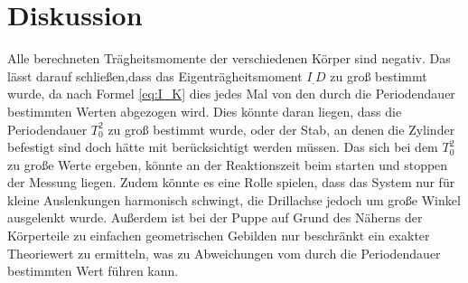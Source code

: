 \section{Diskussion}
\label{sec:Diskussion}
Alle berechneten Trägheitsmomente der verschiedenen Körper sind negativ.
Das lässt darauf schließen,dass das Eigenträgheitsmoment $I_.D$ zu groß bestimmt wurde, da nach Formel \eqref{eq:I_K} dies jedes Mal von den durch die Periodendauer bestimmten Werten abgezogen wird.\newline
Dies könnte daran liegen, dass die Periodendauer $T_0^2$ zu groß bestimmt wurde, oder der Stab, an denen die Zylinder befestigt sind doch hätte mit berücksichtigt werden müssen. Das sich bei dem $T_0^2$ zu große Werte ergeben, könnte an der Reaktionszeit beim starten und stoppen der Messung liegen. Zudem könnte es eine Rolle spielen, dass das System nur für kleine Auslenkungen harmonisch schwingt, die Drillachse jedoch um große Winkel ausgelenkt wurde.\newline
Außerdem ist bei der Puppe auf Grund des Näherns der Körperteile zu einfachen geometrischen Gebilden nur beschränkt ein exakter Theoriewert zu ermitteln, was zu Abweichungen vom durch die Periodendauer bestimmten Wert führen kann.